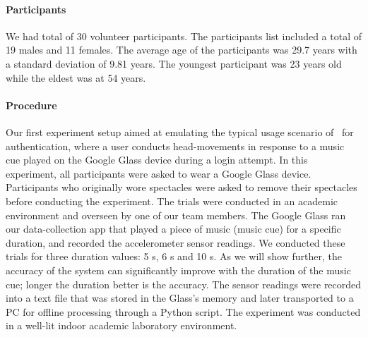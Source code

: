 \paragraph{Participants}

We had total of 30 volunteer participants. The participants list included a total of 19 males and 11 females. 
The average age of the participants was 29.7 years with a standard deviation 
of 9.81 years. The youngest participant was 23 years old while the eldest was 
at 54 years.

\paragraph{Procedure}
Our first experiment setup aimed at emulating the typical usage scenario 
of \systemname~for authentication, where a user conducts head-movements in 
response to a music cue played on the Google Glass device during a login 
attempt. 
In this experiment, all participants were asked to wear a Google Glass 
device. Participants who originally wore spectacles were asked to remove their
spectacles before conducting the experiment.
The trials were conducted in an academic environment and overseen by one of 
our team members.
The Google Glass ran our data-collection app that played a piece of 
music (music cue) for a specific duration, and recorded the accelerometer 
sensor readings. We conducted these trials for three duration values: 5 s, 
6 s and 10 s. As we will show further, the accuracy of the system can 
significantly improve with the duration of the music cue; longer the duration 
better is the accuracy. 
The sensor readings were recorded into a text file that was stored 
in the Glass's memory and later transported to a PC for offline processing
through a Python script. The experiment was conducted in a well-lit indoor 
academic laboratory environment. 
 
